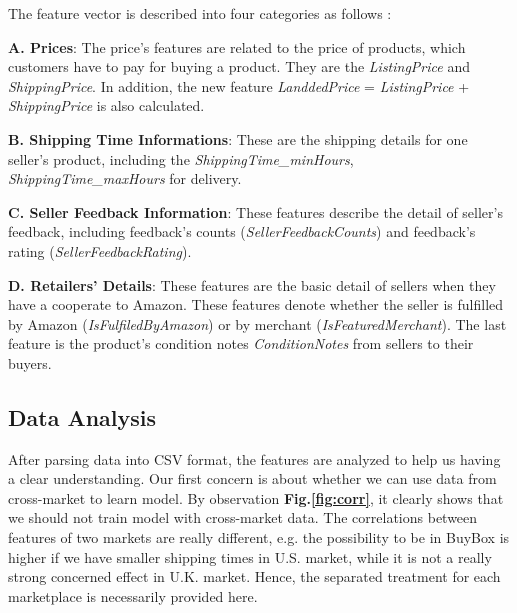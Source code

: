 The feature vector is described into four categories as follows :

\textbf{A. Prices}: The price's features are related to the price of products, which customers have to pay for buying a product. They are the \textit{ListingPrice} and \textit{ShippingPrice}. In addition, the new feature \textit{LanddedPrice} = \textit{ListingPrice} + \textit{ShippingPrice} is also calculated.

\textbf{B. Shipping Time Informations}: These are the shipping details for one seller's product, including the \textit{ShippingTime\_minHours}, \textit{ShippingTime\_maxHours} for delivery. 

\textbf{C. Seller Feedback Information}: These features describe the detail of seller's feedback, including feedback's counts (\textit{SellerFeedbackCounts}) and feedback's rating (\textit{SellerFeedbackRating}). 

\textbf{D. Retailers' Details}: These features are the basic detail of  sellers when they have a cooperate to Amazon. These features denote whether the seller is fulfilled by Amazon (\textit{IsFulfiledByAmazon}) or by merchant (\textit{IsFeaturedMerchant}). The last feature is the product's condition notes \textit{ConditionNotes} from sellers to their buyers.

\subsection{Data Analysis}
\label{sec:dataanalysis}

After parsing data into CSV format, the features are analyzed to help us having a clear understanding. Our first concern is about whether we can use data from cross-market to learn model. 
By observation \textbf{Fig.\ref{fig:corr}}, it clearly shows that we should not train model with cross-market data. 
The correlations between features of two markets are really different, e.g. the possibility to be in BuyBox is higher if we have smaller shipping times
 in U.S. market, while it is not a really strong concerned effect in U.K. market. %
Hence, the separated treatment for each marketplace is necessarily provided here.

